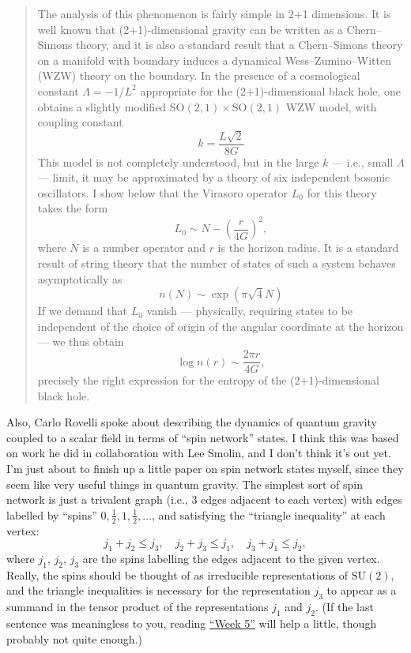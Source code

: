 \documentclass[12pt]{article}
\begin{document}
\begin{quote}
The analysis of this phenomenon is fairly simple in 2+1 dimensions. It
is well known that (2+1)-dimensional gravity can be written as a
Chern--Simons theory, and it is also a standard result that a
Chern--Simons theory on a manifold with boundary induces a dynamical
Wess--Zumino--Witten (WZW) theory on the boundary. In the presence of a
cosmological constant \(\Lambda = -1/L^2\) appropriate for the
(2+1)-dimensional black hole, one obtains a slightly modified
\(\mathrm{SO}(2,1) \times \mathrm{SO}(2,1)\) WZW model, with coupling
constant \[k = \frac{L\sqrt{2}}{8G}\] This model is not completely
understood, but in the large \(k\) --- i.e., small \(\Lambda\) ---
limit, it may be approximated by a theory of six independent bosonic
oscillators. I show below that the Virasoro operator \(L_0\) for this
theory takes the form \[L_0 \sim N -\left(\frac{r}{4G}\right)^2,\] where
\(N\) is a number operator and \(r\) is the horizon radius. It is a
standard result of string theory that the number of states of such a
system behaves asymptotically as \[n(N) \sim \exp(\pi \sqrt{4} N)\] If
we demand that \(L_0\) vanish --- physically, requiring states to be
independent of the choice of origin of the angular coordinate at the
horizon --- we thus obtain \[\log n(r) \sim \frac{2 \pi r}{4G},\]
precisely the right expression for the entropy of the (2+1)-dimensional
black hole.
\end{quote}

Also, Carlo Rovelli spoke about describing the dynamics of quantum
gravity coupled to a scalar field in terms of ``spin network'' states. I
think this was based on work he did in collaboration with Lee Smolin,
and I don't think it's out yet. I'm just about to finish up a little
paper on spin network states myself, since they seem like very useful
things in quantum gravity. The simplest sort of spin network is just a
trivalent graph (i.e., 3 edges adjacent to each vertex) with edges
labelled by ``spins'' \(0,\frac{1}{2},1,\frac{1}{2},\ldots\), and satisfying the
``triangle inequality'' at each vertex:
\[j_1 + j_2 \leqslant j_3, \quad j_2 + j_3 \leqslant j_1, \quad j_3 + j_1 \leqslant j_2,\]
where \(j_1\), \(j_2\), \(j_3\) are the spins labelling the edges
adjacent to the given vertex. Really, the spins should be thought of as
irreducible representations of \(\mathrm{SU}(2)\), and the triangle
inequalities is necessary for the representation \(j_3\) to appear as a
summand in the tensor product of the representations \(j_1\) and
\(j_2\). (If the last sentence was meaningless to you, reading
\protect\hyperlink{week5}{``Week 5''} will help a little, though
probably not quite enough.)
\end{document}
